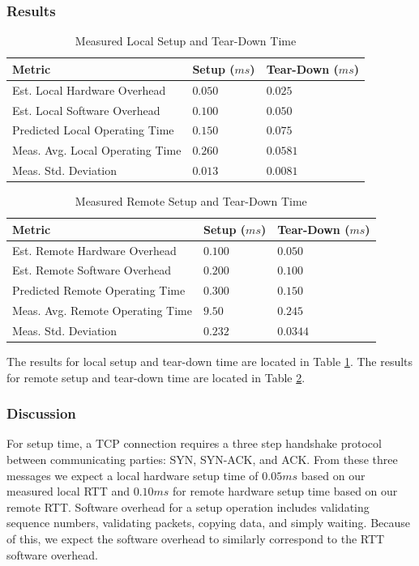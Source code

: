\documentclass[sigconf]{acmart}
\begin{document}
\subsubsection{Results}
\begin{table}[h!]
\centering
\caption{Measured Local Setup and Tear-Down Time}
\label{LocalSetupTearDownMeasurement}
\begin{tabular}{|l|l|l|}
\hline
\textbf{Metric}					& \textbf{Setup ($ms$)}	& \textbf{Tear-Down ($ms$)}	\\ \hline
Est. Local Hardware Overhead	& $0.050$				& $0.025$					\\ \hline
Est. Local Software Overhead	& $0.100$				& $0.050$					\\ \hline
Predicted Local Operating Time	& $0.150$				& $0.075$					\\ \hline
Meas. Avg. Local Operating Time	& $0.260$				& $0.0581$					\\ \hline
Meas. Std. Deviation			& $0.013$				& $0.0081$					\\ \hline
\end{tabular}
\end{table}

\begin{table}[h!]
\centering
\caption{Measured Remote Setup and Tear-Down Time}
\label{RemoteSetupTearDownMeasurement}
\begin{tabular}{|l|l|l|}
\hline
\textbf{Metric}						& \textbf{Setup ($ms$)}	& \textbf{Tear-Down ($ms$)}	\\ \hline
Est. Remote Hardware Overhead		& $0.100$				& $0.050$					\\ \hline
Est. Remote Software Overhead		& $0.200$				& $0.100$					\\ \hline
Predicted Remote Operating Time		& $0.300$				& $0.150$					\\ \hline
Meas. Avg. Remote Operating Time	& $9.50$				& $0.245$					\\ \hline
Meas. Std. Deviation				& $0.232$				& $0.0344$					\\ \hline
\end{tabular}
\end{table}
The results for local setup and tear-down time are located in Table \ref{LocalSetupTearDownMeasurement}. The results for remote setup and tear-down time are located in Table \ref{RemoteSetupTearDownMeasurement}.

\subsubsection{Discussion}
For setup time, a TCP connection requires a three step handshake protocol between communicating parties: SYN, SYN-ACK, and ACK. From these three messages we expect a local hardware setup time of $0.05ms$ based on our measured local RTT and $0.10ms$ for remote hardware setup time based on our remote RTT. Software overhead for a setup operation includes validating sequence numbers, validating packets, copying data, and simply waiting. Because of this, we expect the software overhead to similarly correspond to the RTT software overhead.
\end{document}
